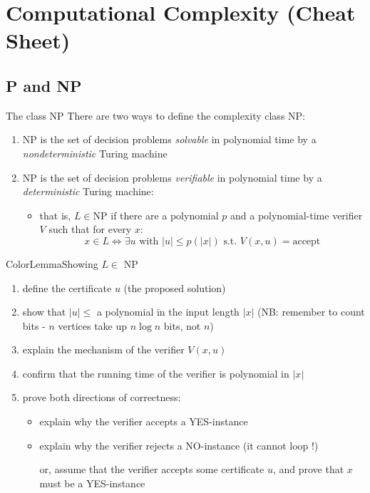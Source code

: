 \documentclass[a4paper, 11pt]{report}
\begin{document}
\makecustomcover

\tableofcontents
\clearpage

\chapter{Computational Complexity (Cheat Sheet)}

\section{P and NP}
\begin{defframe}{The class NP}{}
There are two ways to define the complexity class NP:
\begin{enumerate}
    \item NP is the set of decision problems \textit{solvable} in polynomial time by a \textit{nondeterministic} Turing machine
    \item NP is the set of decision problems \textit{verifiable} in polynomial time by a \textit{deterministic} Turing machine:
        \begin{itemize}
            \item that is, $L \in \text{NP}$ if there are a polynomial $p$ and a polynomial-time verifier $V$ such that for every $x$:
        $$x \in L \iff \exists u \text{ with } |u|\leq p(|x|) \text{ s.t. } V(x, u)=\text{accept}$$
        \end{itemize}
\end{enumerate}
\end{defframe}

\begin{cframe}{ColorLemma}{Showing $L \in$ NP}
    \vspace{-1em}
    \begin{enumerate}
        \item define the certificate $u$ (the proposed solution)
        \item show that $|u| \leq $ a polynomial in the input length $|x|$ (NB: remember to count bits - $n$ vertices take up $n \log n$ bits, not $n$)
        \item explain the mechanism of the verifier $V(x, u)$
        \item confirm that the running time of the verifier is polynomial in $|x|$
        \item prove both directions of correctness:
            \begin{itemize}
                \item explain why the verifier accepts a YES-instance
                \item explain why the verifier rejects a NO-instance (it cannot loop !)

                    or, assume that the verifier accepts some certificate $u$, and prove that $x$ must be a YES-instance
            \end{itemize}
    \end{enumerate}
\end{cframe}
\end{document}
